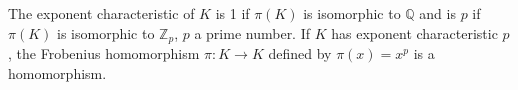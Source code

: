 The exponent characteristic of $K$ is 1 if $\pi(K)$ is isomorphic to $\mathbb{Q}$ and is $p$ if $\pi(K)$ is isomorphic to $\mathbb{Z}_p$, $p$ a prime number. If $K$ has exponent characteristic $p$, the Frobenius homomorphism $\pi: K \to K$ defined by $\pi(x) = x^p$ is a homomorphism.
